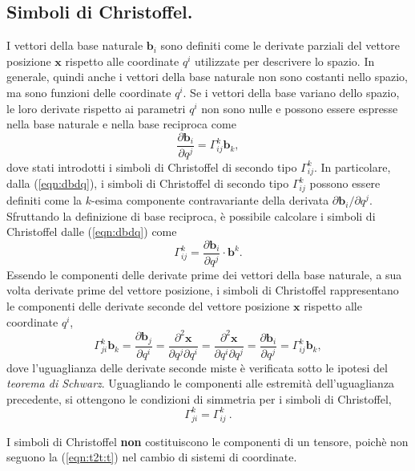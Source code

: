  \subsection{Simboli di Christoffel.} 
I vettori della base naturale $\bm{b}_i$ sono definiti come le derivate parziali del vettore posizione $\bm{x}$ rispetto alle coordinate $q^i$ utilizzate per descrivere lo spazio. In generale, quindi anche i vettori della base naturale non sono costanti nello spazio, ma sono funzioni delle coordinate $q^i$. Se i vettori della base variano dello spazio, le loro derivate rispetto ai parametri $q^i$ non sono nulle e possono essere espresse nella base naturale e nella base reciproca come
\begin{equation}\label{eqn:dbdq}
 \dfrac{\partial \bm{b}_i}{\partial q^j} = \Gamma_{ij}^k \bm{b}_k ,
\end{equation}
 dove stati introdotti i simboli di Christoffel di secondo tipo $\Gamma^{k}_{ij}$. In particolare, dalla (\ref{eqn:dbdq}), i simboli di Christoffel di secondo tipo $\Gamma^{k}_{ij}$ possono essere definiti come la $k$-esima componente contravariante della derivata $\partial \bm{b}_i/\partial q^j$. Sfruttando la definizione di base reciproca, è possibile calcolare i simboli di Christoffel dalle (\ref{eqn:dbdq}) come
\begin{equation}
  \Gamma^{k}_{ij} = \dfrac{\partial \bm{b}_i}{\partial q^j} \cdot \bm{b}^k .
\end{equation}
Essendo le componenti delle derivate prime dei vettori della base naturale, a sua volta derivate prime del vettore posizione, i simboli di Christoffel rappresentano le componenti delle derivate seconde del vettore posizione $\bm{x}$ rispetto alle coordinate $q^i$,
\begin{equation}
 \Gamma_{ji}^k \bm{b}_k = 
 \dfrac{\partial \bm{b}_j}{\partial q^i} =\dfrac{\partial^2 \bm{x}}{\partial q^j \partial q^i} =
 \dfrac{\partial^2 \bm{x}}{\partial q^i \partial q^j} = \dfrac{\partial \bm{b}_i}{\partial q^j}= \Gamma_{ij}^k \bm{b}_k ,
\end{equation}
dove l'uguaglianza delle derivate seconde miste è verificata sotto le ipotesi del \textit{teorema di Schwarz}. Uguagliando le componenti alle estremità dell'uguaglianza precedente, si ottengono le condizioni di simmetria per i simboli di Christoffel,
\begin{equation}
 \Gamma_{ji}^k = \Gamma_{ij}^k \ .
\end{equation}
\begin{remark}
 I simboli di Christoffel \textbf{non} costituiscono le componenti di un tensore, poichè non seguono la (\ref{eqn:t2t:t}) nel cambio di sistemi di coordinate.
\end{remark}

